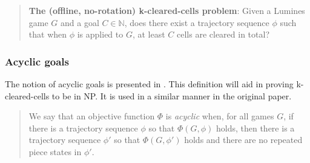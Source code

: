 \begin{quote}
    \textbf{The (offline, no-rotation) k-cleared-cells problem}: Given a Lumines game $G$ and a goal $C \in \mathbb{N}$, does there exist a trajectory sequence $\phi$ such that when $\phi$ is applied to $G$, at least $C$ cells are cleared in total?
\end{quote}

\subsubsection{Acyclic goals}
The notion of acyclic goals is presented in \cite{tetris}. This definition will aid in proving k-cleared-cells to be in NP. It is used in a similar manner in the original paper.

\begin{quote}
    We say that an objective function $\Phi$ is \textit{acyclic} when, for all games $G$, if there is a trajectory sequence $\phi$ so that $\Phi(G, \phi)$ holds, then there is a trajectory sequence $\phi'$ so that $\Phi(G, \phi')$ holds and there are no repeated piece states in $\phi'$.
\end{quote}
